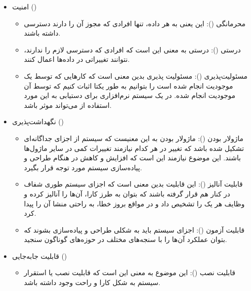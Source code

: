 {\begin{enumerate}[a)]
\begin{itemize}
		\item
		امنیت ()
		
		\begin{itemize}
			\item 
			محرمانگی (): این یعنی به هر داده، تنها افرادی که مجوز آن را دارند دسترسی داشته باشند.
			
			\item 
			درستی (): درستی به معنی این است که افرادی که دسترسی لازم را ندارند، نتوانند تغییراتی در داده‌ها اعمال کنند.
			\item 
			مسئولیت‌پذیری (): مسئولیت پذیری بدین معنی است که کارهایی که توسط یک موجودیت انجام شده است را بتوانیم به طور یکتا اثبات کنیم که توسط آن موجودیت انجام شده. در یک سیستم نرم‌افزاری برای دستیابی به این مورد استفاده از  می‌تواند موثر باشد.
		\end{itemize}
		
		\item 
		نگهداشت‌پذیری ()
		\begin{itemize}
			
			\item
			ماژولار بودن (): ماژولار بودن به این معنیست که سیستم از اجزای جداگانه‌ای تشکیل شده باشد که تغییر در هر کدام نیازمند تغییرات کمی در سایر ماژول‌ها باشند. این موضوع نیازمند این است که افزایش  و کاهش  در هنگام طراحی و پیاده‌سازی سیستم مورد توجه قرار بگیرد.
			
			\item 
			قابلیت آنالیز (): این قابلیت بدین معنی است که اجزای سیستم طوری شفاف در کنار هم قرار گرفته باشند که بتوان به طرز کارا، آن‌ها را آنالیز کرده و وظایف هر یک را تشخیص داد و در مواقع بروز خطا، به راحتی منشا آن را پیدا کرد.
			
			\item 
			قابلیت آزمون (): اجزای سیستم باید به شکلی طراحی و پیاده‌سازی بشوند که بتوان عملکرد آن‌ها را با سنجه‌های مختلف در حوزه‌های گوناگون سنجید.
			
		\end{itemize}
		
		
		\item
		قابلیت جابه‌جایی ()
		
		\begin{itemize}
			\item
			قابلیت نصب ():
			این موضوع به معنی این است که قابلیت نصب یا استقرار سیستم به شکل کارا و راحت وجود داشته باشد.
			

\end{itemize}
\end{itemize}
\end{enumerate}}
